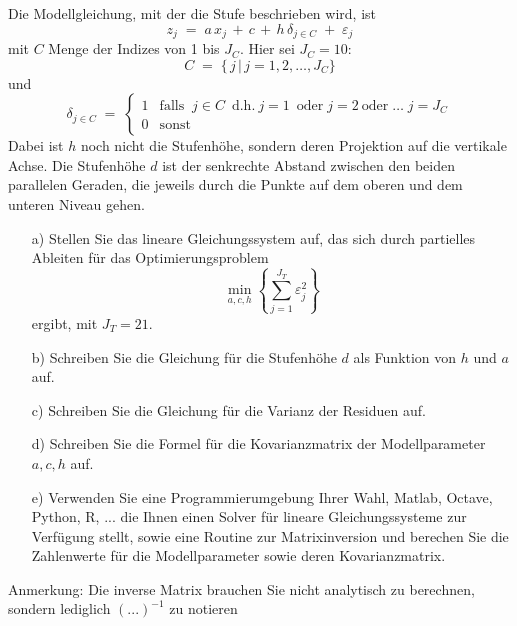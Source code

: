 \vspace{2mm}

Die Modellgleichung, mit der die Stufe beschrieben wird, ist
$$
z_j \; = \; a \, x_j \, + \, c \, + \, h \, \delta_{j \in C} \; + \; \varepsilon_j
$$
mit $C$ Menge der Indizes von 1 bis $J_C$. Hier sei $J_C = 10$:
$$
C \; = \; \{\, j \, | \, j = 1, 2, \dots, J_C \}
$$
und
$$
\delta_{j \in C} \; = \; \left\{
\begin{array}{ll}
1 & \mathrm{falls} \; \;  j \in C \; \mathrm{~d.h.~} j = 1 \; \mathrm{~oder} \; j = 2
\mathrm{~oder} \; \dots \; j = J_C\\
0 & \mathrm{sonst}
\end{array} \right.
$$
Dabei ist $h$ noch nicht die Stufenhöhe, sondern deren Projektion auf die vertikale Achse.
Die Stufenhöhe $d$ ist der senkrechte Abstand zwischen den beiden parallelen Geraden, die jeweils durch die Punkte auf dem oberen und dem unteren Niveau gehen.

\begin{itemize}
	\item[a)] Stellen Sie das lineare Gleichungssystem auf, das sich durch partielles Ableiten
	für das Optimierungsproblem
	$$
	\min\limits_{a,c,h} \left\{\sum_{j=1}^{J_T} \varepsilon_j^2\right\}
	$$
	ergibt, mit $J_T = 21$.
	\item[b)] Schreiben Sie die Gleichung für die Stufenhöhe $d$ als Funktion von $h$ und $a$ auf.
	\item[c)] Schreiben Sie die Gleichung für die Varianz der Residuen auf.
	\item[d)] Schreiben Sie die Formel für die Kovarianzmatrix der Modellparameter
	$a, c, h$ auf.
	\item[e)] Verwenden Sie eine Programmierumgebung Ihrer Wahl, Matlab, Octave, Python, R, ...
	die Ihnen einen Solver für lineare Gleichungssysteme zur Verfügung stellt, sowie
	eine Routine zur Matrixinversion und berechen Sie die Zahlenwerte für die Modellparameter
	sowie deren Kovarianzmatrix.
\end{itemize}
Anmerkung: Die inverse Matrix brauchen Sie nicht analytisch zu berechnen, sondern
	lediglich $(...)^{-1}$ zu notieren




